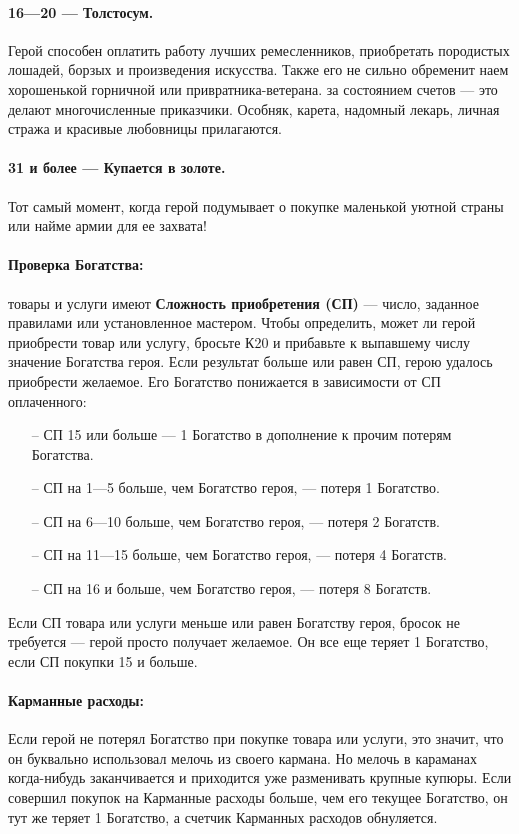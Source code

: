 \paragraph{16—20 — Толстосум.} Герой способен оплатить работу лучших ремесленников, приобретать породистых лошадей, борзых и произведения искусства. Также его не сильно обременит наем хорошенькой горничной или привратника-ветерана. за состоянием счетов — это делают многочисленные приказчики. Особняк, карета, надомный лекарь, личная стража и красивые любовницы прилагаются.
\paragraph{31 и более — Купается в золоте.} Тот самый момент, когда герой подумывает о покупке маленькой уютной страны или найме армии для ее захвата!
\paragraph{Проверка Богатства:} товары и услуги имеют \textbf{Сложность приобретения (СП)} — число, заданное правилами или установленное мастером. Чтобы определить, может ли герой приобрести товар или услугу, бросьте К20 и прибавьте к выпавшему числу значение Богатства героя. Если результат больше или равен СП, герою удалось приобрести желаемое. Его Богатство понижается в зависимости от СП оплаченного:
\begin{itemize}
\item[--] СП 15 или больше — 1 Богатство в дополнение к прочим потерям
Богатства.
\item[--] СП на 1—5 больше, чем Богатство героя, — потеря 1 Богатство.
\item[--] СП на 6—10 больше, чем Богатство героя, — потеря 2 Богатств.
\item[--] СП на 11—15 больше, чем Богатство героя, — потеря 4 Богатств.
\item[--] СП на 16 и больше, чем Богатство героя, — потеря 8 Богатств.
\end{itemize}
Если СП товара или услуги меньше или равен Богатству героя, бросок не требуется — герой просто получает желаемое. Он все еще теряет 1 Богатство, если СП покупки 15 и больше. 
\paragraph{Карманные расходы:}
Если герой не потерял Богатство при покупке товара или услуги, это значит, что он буквально использовал мелочь из своего кармана. Но мелочь в караманах когда-нибудь заканчивается и приходится уже разменивать крупные купюры. Если совершил покупок на Карманные расходы больше, чем его текущее Богатство, он тут же теряет 1 Богатство, а счетчик Карманных расходов обнуляется.


